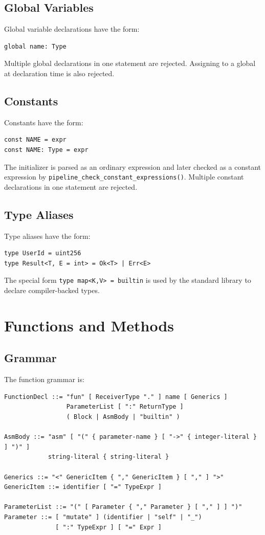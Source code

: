 \documentclass[12pt,oneside]{article}
\begin{document}
\subsection{Global Variables}
Global variable declarations have the form:

\begin{verbatim}
global name: Type
\end{verbatim}

Multiple global declarations in one statement are rejected. Assigning to a
global at declaration time is also rejected.

\subsection{Constants}
Constants have the form:

\begin{verbatim}
const NAME = expr
const NAME: Type = expr
\end{verbatim}

The initializer is parsed as an ordinary expression and later checked as a
constant expression by \verb|pipeline_check_constant_expressions()|. Multiple
constant declarations in one statement are rejected.

\subsection{Type Aliases}
Type aliases have the form:

\begin{verbatim}
type UserId = uint256
type Result<T, E = int> = Ok<T> | Err<E>
\end{verbatim}

The special form \verb|type map<K,V> = builtin| is used by the standard library
to declare compiler-backed types.

\section{Functions and Methods}
\label{sec:functions}
\subsection{Grammar}
The function grammar is:

\begin{verbatim}
FunctionDecl ::= "fun" [ ReceiverType "." ] name [ Generics ]
                 ParameterList [ ":" ReturnType ]
                 ( Block | AsmBody | "builtin" )

AsmBody ::= "asm" [ "(" { parameter-name } [ "->" { integer-literal } ] ")" ]
            string-literal { string-literal }

Generics ::= "<" GenericItem { "," GenericItem } [ "," ] ">"
GenericItem ::= identifier [ "=" TypeExpr ]

ParameterList ::= "(" [ Parameter { "," Parameter } [ "," ] ] ")"
Parameter ::= [ "mutate" ] (identifier | "self" | "_")
              [ ":" TypeExpr ] [ "=" Expr ]
\end{verbatim}
\end{document}
